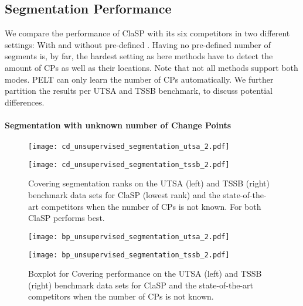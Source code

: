 \documentclass[pdflatex,sn-basic]{sn-jnl}
\begin{document}
\subsection{Segmentation Performance}
\label{sec:benchmark_segmentation}

We compare the performance of ClaSP with its six competitors in two different settings: With and without pre-defined . Having no pre-defined number of segments is, by far, the hardest setting as here methods have to detect the amount of CPs as well as their locations. Note that not all methods support both modes. PELT can only learn the number of CPs automatically. We further partition the results per UTSA and TSSB benchmark, to discuss potential differences.

\paragraph{Segmentation with unknown number of Change Points}

\begin{figure}[t]
	\begin{minipage}{6cm}
        \texttt{[image: cd\_unsupervised\_segmentation\_utsa\_2.pdf]}
	\end{minipage}
	\begin{minipage}{6cm}
        \texttt{[image: cd\_unsupervised\_segmentation\_tssb\_2.pdf]}
	\end{minipage}
	\caption{Covering segmentation ranks on the  UTSA (left) and  TSSB (right) benchmark data sets for ClaSP (lowest rank) and the  state-of-the-art competitors when the number of CPs is not known. For both ClaSP performs best.\label{fig:cd_unsupervised_seg}
	}
\end{figure}

\begin{figure}[t]
	\begin{minipage}{6cm}
        \texttt{[image: bp\_unsupervised\_segmentation\_utsa\_2.pdf]}
	\end{minipage}
	\begin{minipage}{6cm}
        \texttt{[image: bp\_unsupervised\_segmentation\_tssb\_2.pdf]}
	\end{minipage}
	\caption{Boxplot for Covering performance on the  UTSA (left) and  TSSB (right) benchmark data sets for ClaSP and the state-of-the-art competitors when the number of CPs is not known.\label{fig:boxplot_unsupervised_seg}
	}
\end{figure}
\end{document}
